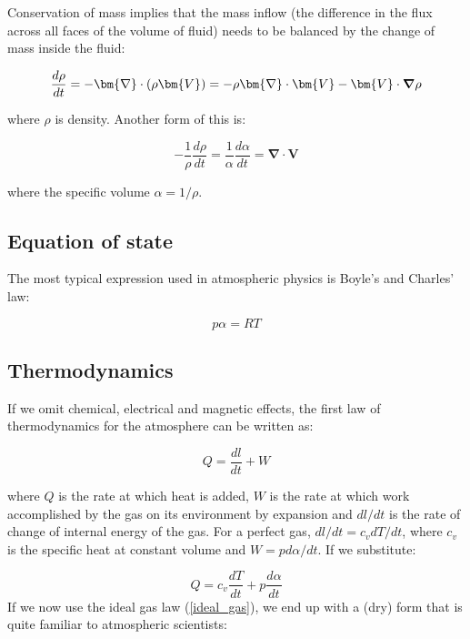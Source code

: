 Conservation of mass implies that the mass inflow (the difference in the flux across all faces of the volume of fluid) needs to be balanced by the change of mass inside the fluid:

\begin{equation}
	\frac{d \rho}{dt} =  -\bm{\nabla} \cdot (\rho \bm{V}) = - \rho \bm{\nabla} \cdot {\bm{V} }  -\bm{V} \cdot \grad{\rho}
\end{equation}

where $\rho$ is density. Another form of this is:

\begin{equation}
	-\frac{1}{\rho} \frac{d \rho}{dt} =   \frac{1}{\alpha} \frac{d \alpha}{dt}     = \bm{\nabla} \cdot  \bm{V} 
\end{equation}


where the specific volume $\alpha = 1/\rho$.

\subsection{Equation of state}

The most typical expression used in atmospheric physics is Boyle's and Charles' law:

\begin{equation}
	p\alpha=RT
	\label{ideal_gas}
\end{equation}


\subsection{Thermodynamics}

If we omit chemical, electrical and magnetic effects, the first law of thermodynamics for the atmosphere can be written as:

\begin{equation}
	Q=\frac{dl}{dt} + W
\end{equation}

where $Q$ is the rate at which heat is added, $W$ is the rate at which work accomplished by the gas on its environment by expansion and $dl/dt$ is the rate of change of internal energy of the gas. For a perfect gas, $dl/dt=c_vdT/dt$, where $c_v$ is the specific heat at constant volume and $W=p d\alpha/dt$. If we substitute:

 \begin{equation}
 	Q= c_v \frac{dT}{dt} + p\frac{d\alpha}{dt} 
 \end{equation}
If we now use the ideal gas law (\ref{ideal_gas}), we end up with a (dry) form that is quite familiar to atmospheric scientists:

